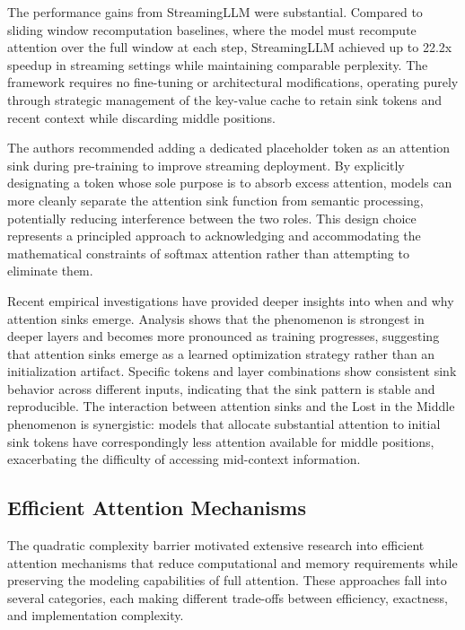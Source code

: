 \documentclass[11pt,letterpaper]{article}
\begin{document}
The performance gains from StreamingLLM were substantial. Compared to sliding window recomputation baselines, where the model must recompute attention over the full window at each step, StreamingLLM achieved up to 22.2x speedup in streaming settings while maintaining comparable perplexity. The framework requires no fine-tuning or architectural modifications, operating purely through strategic management of the key-value cache to retain sink tokens and recent context while discarding middle positions.

The authors recommended adding a dedicated placeholder token as an attention sink during pre-training to improve streaming deployment. By explicitly designating a token whose sole purpose is to absorb excess attention, models can more cleanly separate the attention sink function from semantic processing, potentially reducing interference between the two roles. This design choice represents a principled approach to acknowledging and accommodating the mathematical constraints of softmax attention rather than attempting to eliminate them.

Recent empirical investigations have provided deeper insights into when and why attention sinks emerge. Analysis shows that the phenomenon is strongest in deeper layers and becomes more pronounced as training progresses, suggesting that attention sinks emerge as a learned optimization strategy rather than an initialization artifact. Specific tokens and layer combinations show consistent sink behavior across different inputs, indicating that the sink pattern is stable and reproducible. The interaction between attention sinks and the Lost in the Middle phenomenon is synergistic: models that allocate substantial attention to initial sink tokens have correspondingly less attention available for middle positions, exacerbating the difficulty of accessing mid-context information.

\subsection{Efficient Attention Mechanisms}

The quadratic complexity barrier motivated extensive research into efficient attention mechanisms that reduce computational and memory requirements while preserving the modeling capabilities of full attention. These approaches fall into several categories, each making different trade-offs between efficiency, exactness, and implementation complexity.
\end{document}
